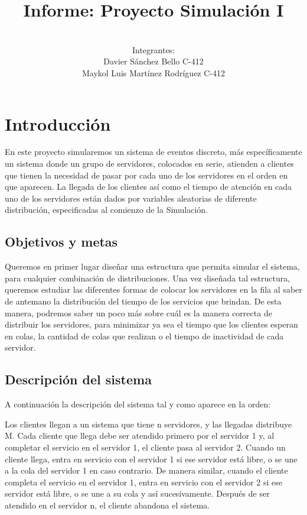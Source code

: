 \documentclass[12pt]{article}
\title{Informe: Proyecto Simulación I}
\author{
\vspace{3cm}\\
  Integrantes:\\
  Davier Sánchez Bello C-412\\
  Maykol Luis Martínez Rodríguez C-412
}
\begin{document}
\maketitle
\newpage
\section{Introducción}
En este proyecto simularemos un sistema de eventos discreto, más específicamente un sistema donde un grupo de servidores, colocados en serie, atienden a clientes que tienen la necesidad de pasar por cada uno de los servidores en el orden en que aparecen. La llegada de los clientes así como el tiempo de atención en cada uno de los servidores están dados por variables aleatorias de diferente distribución, especificadas al comienzo de la Simulación.

\subsection{Objetivos y metas}
Queremos en primer lugar diseñar una estructura que permita simular el sistema, para cualquier combinación de distribuciones. Una vez diseñada tal estructura, queremos estudiar las diferentes formas de colocar los servidores en la fila al saber de antemano la distribución del tiempo de los servicios que brindan. De esta manera, podremos saber un poco más sobre cuál es la manera correcta de distribuir los servidores, para minimizar ya sea el tiempo que los clientes esperan en colas, la cantidad de colas que realizan o el tiempo de inactividad de cada servidor.

\subsection{Descripción del sistema}
A continuación la descripción del sistema tal y como aparece en la orden:

Los clientes llegan a un sistema que tiene n servidores, y las llegadas distribuye M. Cada cliente que llega debe ser atendido primero por el servidor 1 y, al completar el servicio en el servidor 1, el cliente pasa al servidor 2.
Cuando un cliente llega, entra en servicio con el servidor 1 si ese servidor está libre, o se une a la cola del servidor 1 en caso contrario. De manera similar, cuando el cliente completa el servicio en el servidor 1, entra en servicio con el servidor 2 si ese servidor está libre, o se une a su cola y así sucesivamente. Después de ser atendido en el servidor n, el cliente abandona el sistema.
\end{document}
